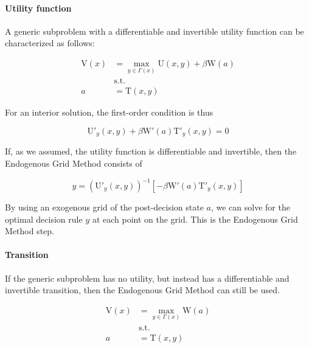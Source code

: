 \documentclass{article}
\newcommand{\aRat}{a}
\newcommand{\DiscFac}{\beta}
\newcommand{\TFunc}{\mathrm{T}}
\newcommand{\UFunc}{\mathrm{U}}
\newcommand{\VFunc}{\mathrm{V}}
\newcommand{\WFunc}{\mathrm{W}}
\newcommand{\PGro}{\Gamma}
\newcommand{\xRat}{x}
\newcommand{\yRat}{y}
\begin{document}
\paragraph{Utility function}\label{Utility function}

A generic subproblem with a differentiable and invertible utility function can be characterized as follows:

\begin{equation}
\begin{split}
        \VFunc(\xRat) &  = \max_{\yRat  \in \PGro(\xRat)} \UFunc(\xRat, \yRat) + \DiscFac \WFunc(\aRat) \\
        & \text{s.t.} \\
        \aRat & = \TFunc(\xRat,\yRat)
    \end{split}
\end{equation}

For an interior solution, the first-order condition is thus

\begin{equation}
\UFunc'_{\yRat}(\xRat, \yRat) + \DiscFac \WFunc'(\aRat)\TFunc'_{\yRat}(\xRat,\yRat) = 0
\end{equation}

If, as we assumed, the utility function is differentiable and invertible, then the Endogenous Grid Method consists of

\begin{equation}
\yRat = \left(\UFunc'_{\yRat}(\xRat, \yRat)\right)^{-1} \left[ -\DiscFac \WFunc'(\aRat)\TFunc'_{\yRat}(\xRat,\yRat)\right]
\end{equation}

By using an exogenous grid of the post-decision state $\aRat$, we can solve for the optimal decision rule $\yRat$ at each point on the grid. This is the Endogenous Grid Method step.

\paragraph{Transition}\label{Transition}

If the generic subproblem has no utility, but instead has a differentiable and invertible transition, then the Endogenous Grid Method can still be used.

\begin{equation}
\begin{split}
        \VFunc(\xRat) &  = \max_{\yRat  \in \PGro(\xRat)}  \WFunc(\aRat) \\
        & \text{s.t.} \\
        \aRat & = \TFunc(\xRat,\yRat)
    \end{split}
\end{equation}
\end{document}
